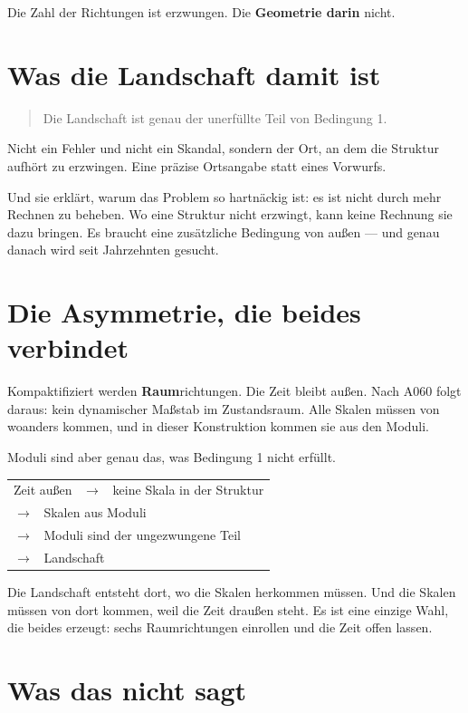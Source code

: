 \documentclass[11pt]{report}
\begin{document}
Die Zahl der Richtungen ist erzwungen. Die \textbf{Geometrie darin}
nicht.

\section{Was die Landschaft damit ist}

\begin{quote}
Die Landschaft ist genau der unerfüllte Teil von Bedingung 1.
\end{quote}

Nicht ein Fehler und nicht ein Skandal, sondern der Ort, an dem die
Struktur aufhört zu erzwingen. Eine präzise Ortsangabe statt eines
Vorwurfs.

Und sie erklärt, warum das Problem so hartnäckig ist: es ist nicht
durch mehr Rechnen zu beheben. Wo eine Struktur nicht erzwingt, kann
keine Rechnung sie dazu bringen. Es braucht eine zusätzliche Bedingung
von außen --- und genau danach wird seit Jahrzehnten gesucht.

\section{Die Asymmetrie, die beides verbindet}

Kompaktifiziert werden \textbf{Raum}richtungen. Die Zeit bleibt außen.
Nach A060 folgt daraus: kein dynamischer Maßstab im Zustandsraum. Alle
Skalen müssen von woanders kommen, und in dieser Konstruktion kommen
sie aus den Moduli.

Moduli sind aber genau das, was Bedingung 1 nicht erfüllt.
\begin{center}
\begin{tabular}{l}
Zeit außen \ $\to$ \ keine Skala in der Struktur \\
\phantom{Zeit außen} $\to$ \ Skalen aus Moduli \\
\phantom{Zeit außen} $\to$ \ Moduli sind der ungezwungene Teil \\
\phantom{Zeit außen} $\to$ \ Landschaft \\
\end{tabular}
\end{center}

Die Landschaft entsteht dort, wo die Skalen herkommen müssen. Und die
Skalen müssen von dort kommen, weil die Zeit draußen steht. Es ist eine
einzige Wahl, die beides erzeugt: sechs Raumrichtungen einrollen und
die Zeit offen lassen.

\section{Was das nicht sagt}
\end{document}
